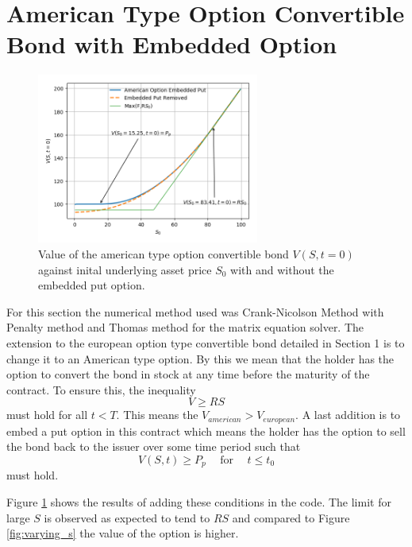 \documentclass{article}
\begin{document}
\section{American Type Option Convertible Bond with Embedded Option}
\begin{figure}[!h]
\includegraphics[width=0.65\textwidth,center]{../images/american_varying_s.png}
\caption{Value of the american type option convertible bond $V(S,t=0)$ against inital underlying asset price $S_0$ with and without the embedded put option.}
\label{fig:american_varying_s}
\end{figure}
For this section the numerical method used was Crank-Nicolson Method with Penalty method and Thomas method for the matrix equation solver.
The extension to the european option type convertible bond detailed in Section 1 is to change it to an American type option.
By this we mean that the holder has the option to convert the bond in stock at any time before the maturity of the contract.
To ensure this, the inequality
\begin{equation}
  V \geq RS
  \label{eq:inequality}
\end{equation}
must hold for all $t<T$.
This means the $V_{american}>V_{european}$.
A last addition is to embed a put option in this contract which means the holder has the option to sell the bond back to the issuer over some time period such that
\begin{equation}
  V(S,t) \geq P_p \hspace{15pt} \text{for} \hspace{15pt} t \leq t_0
  \label{eq:inequality_2}
\end{equation}
must hold.
\\
\par Figure \ref{fig:american_varying_s} shows the results of adding these conditions in the code.
The limit for large $S$ is observed as expected to tend to $RS$ and compared to Figure \ref{fig:varying_s} the value of the option is higher.
\end{document}
